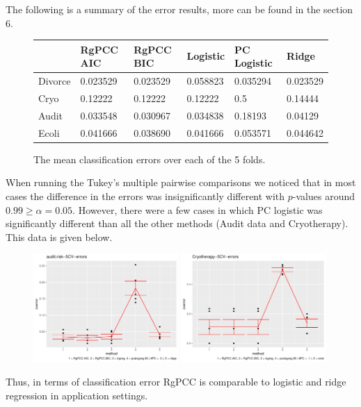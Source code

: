 \documentclass[main.tex]{subfiles}
\begin{document}
The following is a summary of the error results, more can be found in the section 6.

\begin{figure}[H]
	\begin{tabular}{l | l l l l l} \hline
    & RgPCC AIC & RgPCC BIC & Logistic & PC Logistic & Ridge \\ \hline
    \rowcolor{LightCyan}
    Divorce & 0.023529 & 0.023529 & 0.058823 & 0.035294 & 0.023529\\
    Cryo & 0.12222 & 0.12222 & 0.12222         &  0.5 & 0.14444 \\
    \rowcolor{LightCyan}
    Audit & 0.033548 & 0.030967 & 0.034838    & 0.18193 & 0.04129\\
    Ecoli & 0.041666 & 0.038690 & 0.041666  & 0.053571 & 0.044642\\ \hline
	\end{tabular}
	\caption{The mean classification errors over each of the 5 folds.}
\end{figure}

When running the Tukey's multiple pairwise comparisons we noticed that in most cases the difference in the errors was insignificantly different with $p$-values around $0.99 \geq \alpha = 0.05$. However, there were a few cases in which PC logistic was significantly different than all the other methods (Audit data and Cryotherapy). This data is given below.

\begin{figure}[H]
    \centering
    \includegraphics[width =  0.49\textwidth]{realworld/audit.risk-5CV-errors graph.pdf}
    \includegraphics[width =  0.49\textwidth]{realworld/Cryotherapy-5CV-errors graph.pdf}
    \label{fig:my_label}
\end{figure}

Thus, in terms of classification error RgPCC is comparable to logistic and ridge regression in application settings.
\end{document}
